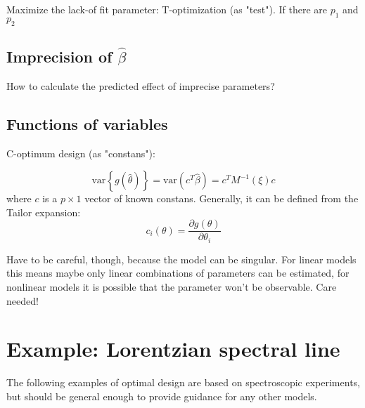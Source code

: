 \documentclass[12pt]{iopart}
\begin{document}
Maximize the lack-of fit parameter: T-optimization (as "test"). If there are $p_1$ and $p_2$ 

\subsection{Imprecision of $\hat \beta$}

How to calculate the predicted effect of imprecise parameters?

\subsection{Functions of variables}

C-optimum design (as "constans"):

\begin{equation}
\mathrm{var}\left\{g(\hat \theta)\right\} = \mathrm{var}(c^T \hat \beta) = c^T M^{-1}(\xi) c
\end{equation}
where $c$ is a $p \times 1$ vector of known constans. Generally, it can be defined from the Tailor expansion:
\begin{equation}
c_i(\theta) = \frac{\partial g(\theta)}{\partial \theta_i}
\end{equation}

Have to be careful, though, because the model can be singular. For linear models this means maybe only linear combinations of parameters can be estimated, for nonlinear models it is possible that the parameter won't be observable. Care needed!

\section{Example: Lorentzian spectral line}

The following examples of optimal design are based on spectroscopic experiments, but should be general enough to provide guidance for any other models.
\end{document}
